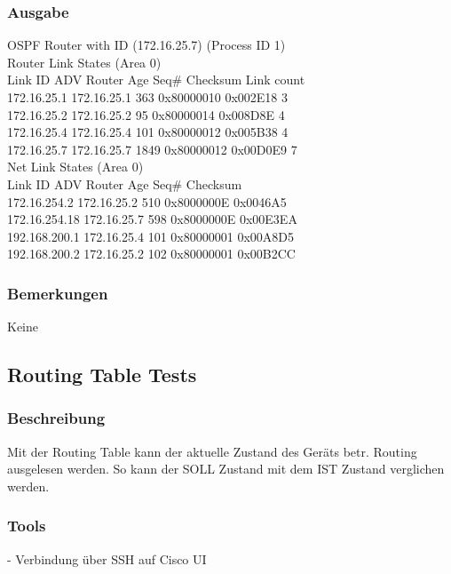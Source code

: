 \documentclass[a4,12pt]{scrartcl}
\begin{document}
\subsubsection{Ausgabe}
            OSPF Router with ID (172.16.25.7) (Process ID 1)\\

                Router Link States (Area 0)\\

\noindent Link ID         ADV Router      Age         Seq#       Checksum Link count\\
172.16.25.1     172.16.25.1     363         0x80000010 0x002E18 3\\
172.16.25.2     172.16.25.2     95          0x80000014 0x008D8E 4\\
172.16.25.4     172.16.25.4     101         0x80000012 0x005B38 4\\
172.16.25.7     172.16.25.7     1849        0x80000012 0x00D0E9 7\\

                Net Link States (Area 0)\\

\noindent Link ID         ADV Router      Age         Seq#       Checksum\\
172.16.254.2    172.16.25.2     510         0x8000000E 0x0046A5\\
172.16.254.18   172.16.25.7     598         0x8000000E 0x00E3EA\\
192.168.200.1   172.16.25.4     101         0x80000001 0x00A8D5\\
192.168.200.2   172.16.25.2     102         0x80000001 0x00B2CC
\subsubsection{Bemerkungen}
Keine

\subsection{Routing Table Tests}
\subsubsection{Beschreibung}
Mit der Routing Table kann der aktuelle Zustand des Geräts betr. Routing ausgelesen werden. So kann der SOLL Zustand mit dem IST Zustand verglichen werden.
\subsubsection{Tools}
- Verbindung über SSH auf Cisco UI
\end{document}
